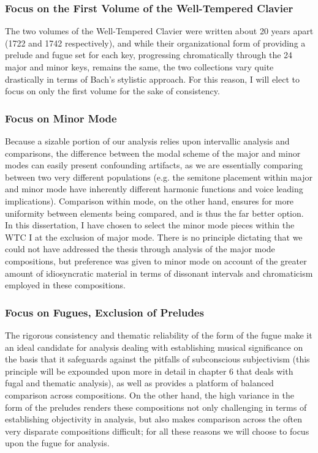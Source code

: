 \subsubsection{Focus on the First Volume of the Well-Tempered
Clavier}\label{focus-on-the-first-volume-of-the-well-tempered-clavier}

The two volumes of the Well-Tempered Clavier were written about 20 years
apart (1722 and 1742 respectively), and while their organizational form
of providing a prelude and fugue set for each key, progressing
chromatically through the 24 major and minor keys, remains the same, the
two collections vary quite drastically in terms of Bach's stylistic
approach. For this reason, I will elect to focus on only the first
volume for the sake of consistency.

\subsubsection{Focus on Minor Mode}\label{focus-on-minor-mode}

Because a sizable portion of our analysis relies upon intervallic
analysis and comparisons, the difference between the modal scheme of the
major and minor modes can easily present confounding artifacts, as we
are essentially comparing between two very different populations (e.g.
the semitone placement within major and minor mode have inherently
different harmonic functions and voice leading implications). Comparison
within mode, on the other hand, ensures for more uniformity between
elements being compared, and is thus the far better option. In this
dissertation, I have chosen to select the minor mode pieces within the
WTC I at the exclusion of major mode. There is no principle dictating
that we could not have addressed the thesis through analysis of the
major mode compositions, but preference was given to minor mode on
account of the greater amount of idiosyncratic material in terms of
dissonant intervals and chromaticism employed in these compositions.

\subsubsection{Focus on Fugues, Exclusion of
Preludes}\label{focus-on-fugues-exclusion-of-preludes}

The rigorous consistency and thematic reliability of the form of the
fugue make it an ideal candidate for analysis dealing with establishing
musical significance on the basis that it safeguards against the
pitfalls of subconscious subjectivism (this principle will be expounded
upon more in detail in chapter 6 that deals with fugal and thematic
analysis), as well as provides a platform of balanced comparison across
compositions. On the other hand, the high variance in the form of the
preludes renders these compositions not only challenging in terms of
establishing objectivity in analysis, but also makes comparison across
the often very disparate compositions difficult; for all these reasons
we will choose to focus upon the fugue for analysis.

